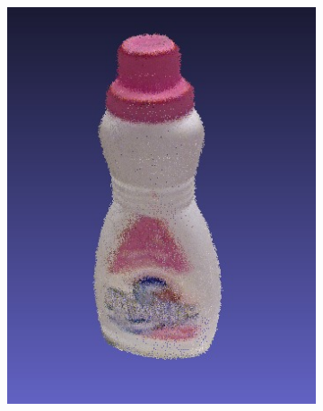 \documentclass[letterpaper, 10 pt, conference]{ieeeconf}  %
\begin{document}
\begin{figure}[th]
        \begin{subfigure}[b]{0.333333\linewidth}
                \centering
                \includegraphics[width=\linewidth]{../models/rose_bottle.jpg}
        \end{subfigure}%
        \begin{subfigure}[b]{0.333333\linewidth}
                \centering

\end{subfigure}
\end{figure}
\end{document}
